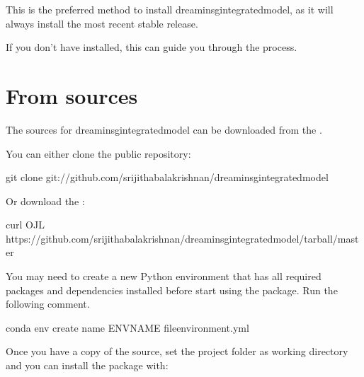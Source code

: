 \documentclass[letterpaper,12pt,english]{sphinxmanual}
\begin{document}
\sphinxAtStartPar
This is the preferred method to install dreaminsg\sphinxhyphen{}integrated\sphinxhyphen{}model, as it will always install the most recent stable release.

\sphinxAtStartPar
If you don’t have  installed, this  can guide
you through the process.


\section{From sources}
\label{\detokenize{index:from-sources}}
\sphinxAtStartPar
The sources for dreaminsg\sphinxhyphen{}integrated\sphinxhyphen{}model can be downloaded from the .

\sphinxAtStartPar
You can either clone the public repository:

\begin{sphinxVerbatim}[commandchars=\\\{\}]
git clone git://github.com/srijithabalakrishnan/dreaminsg\PYGZus{}integrated\PYGZus{}model
\end{sphinxVerbatim}

\sphinxAtStartPar
Or download the :

\begin{sphinxVerbatim}[commandchars=\\\{\}]
curl \PYGZhy{}OJL https://github.com/srijithabalakrishnan/dreaminsg\PYGZus{}integrated\PYGZus{}model/tarball/master
\end{sphinxVerbatim}

\sphinxAtStartPar
You may need to create a new Python environment that has all required packages and dependencies installed before start using the package.
Run the following comment.

\begin{sphinxVerbatim}[commandchars=\\\{\}]
conda env create \PYGZhy{}\PYGZhy{}name ENV\PYGZus{}NAME \PYGZhy{}\PYGZhy{}fileenvironment.yml
\end{sphinxVerbatim}

\sphinxAtStartPar
Once you have a copy of the source, set the project folder as working directory and you can install the package with:
\end{document}
